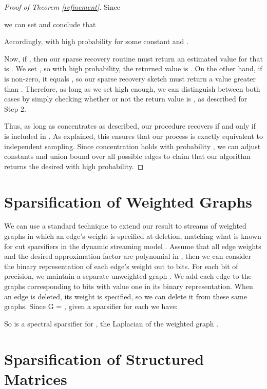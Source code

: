 \documentclass[11pt]{article}
\begin{document}
\begin{proof}[Proof of Theorem \ref{refinement}]
Since

we can set  and conclude that
 
Accordingly,  with high probability for some constant  and .

Now, if , then our sparse recovery routine must return an estimated value for  that is . We set , so with high probability, the returned value is . On the other hand, if  is non-zero, it equals , so our sparse recovery sketch must return a value greater than . Therefore, as long as we set  high enough, we can distinguish between both cases by simply checking whether or not the return value is , as described for Step 2.

Thus, as long as  concentrates as described, our procedure recovers  if and only if  is included in . As explained, this ensures that our process is exactly equivalent to independent sampling. Since concentration holds with probability , we can adjust constants and union bound over all  possible edges to claim that our algorithm returns the desired  with high probability.

\end{proof}





\section{Sparsification of Weighted Graphs}\label{weighted}

We can use a standard technique to extend our result to streams of weighted graphs in which an edge's weight is specified at deletion, matching what is known for cut sparsifiers in the dynamic streaming model \cite{gssss,goel2012single}. Assume that all edge weights and the desired approximation factor  are polynomial in , then we can consider the binary representation of each edge's weight out to  bits. For each bit of precision, we maintain a separate unweighted graph . We add each edge to the graphs corresponding to bits with value one in its binary representation. When an edge is deleted, its weight is specified, so we can delete it from these same graphs. Since G = , given a  sparsifier  for each  we have:

So  is a spectral sparsifier for , the Laplacian of the weighted graph .

\section{Sparsification of Structured Matrices}\label{structured}
\end{document}
